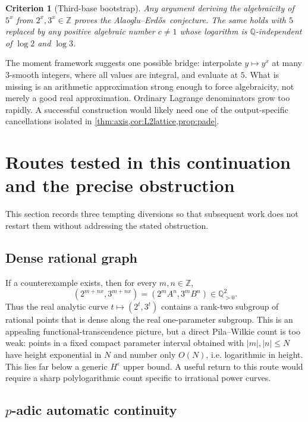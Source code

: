 \documentclass[11pt]{article}
\newtheorem{criterion}[theorem]{Criterion}
\theoremstyle{definition}
\theoremstyle{remark}
\newcommand{\Z}{\mathbb Z}
\newcommand{\Q}{\mathbb Q}
\newcommand{\AEname}{Alaoglu--Erd\H{o}s}
\begin{document}
\begin{criterion}[Third-base bootstrap]\label{crit:thirdbase}
Any argument deriving the algebraicity of $5^x$ from $2^x,3^x\in\Z$ proves the \AEname\
conjecture.  The same holds with $5$ replaced by any positive algebraic number $c\ne1$ whose
logarithm is $\Q$-independent of $\log2$ and $\log3$.
\end{criterion}

The moment framework suggests one possible bridge: interpolate $y\mapsto y^x$ at many
$3$-smooth integers, where all values are integral, and evaluate at $5$.  What is missing is
an arithmetic approximation strong enough to force algebraicity, not merely a good real
approximation.  Ordinary Lagrange denominators grow too rapidly.  A successful construction
would likely need one of the output-specific cancellations isolated in
\cref{thm:axis,cor:L2lattice,prop:pade}.

\section{Routes tested in this continuation and the precise obstruction}

This section records three tempting diversions so that subsequent work does not restart them
without addressing the stated obstruction.

\subsection{Dense rational graph}

If a counterexample exists, then for every $m,n\in\Z$,
\[
 (2^{m+nx},3^{m+nx})=(2^mA^n,3^mB^n)\in\Q_{>0}^2.
\]
Thus the real analytic curve $t\mapsto(2^t,3^t)$ contains a rank-two subgroup of rational
points that is dense along the real one-parameter subgroup.  This is an appealing
functional-transcendence picture, but a direct Pila--Wilkie count is too weak: points in a
fixed compact parameter interval obtained with $|m|,|n|\le N$ have height exponential in
$N$ and number only $O(N)$, i.e. logarithmic in height.  This lies far below a generic
$H^\varepsilon$ upper bound.  A useful return to this route would require a sharp
polylogarithmic count specific to irrational power curves.

\subsection{\texorpdfstring{$p$}{p}-adic automatic continuity}
\end{document}
